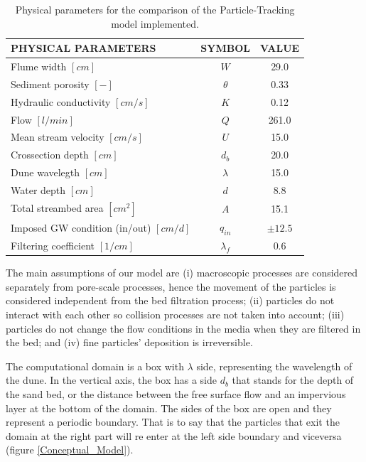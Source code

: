 \documentclass[draft,linenumbers]{agujournal2018}
\begin{document}
\begin{table}
\caption{Physical parameters \citep{Packman2000,Fox2014,Fox2018} for the comparison of the Particle-Tracking model implemented.}
\label{TF:Phys_Param}
\centering
\begin{tabular}{l c c}
\hline
PHYSICAL PARAMETERS						    & SYMBOL			& VALUE			\\
\hline
  Flume width $[cm]$  					    & $W$				& 29.0 			\\
  Sediment porosity $[-]$				    & $\theta$			& 0.33 			\\
  Hydraulic conductivity $[cm/s]$ 		    & $K$				& 0.12 			\\
  Flow $[l/min]$						    & $Q$				& 261.0			\\
  Mean stream velocity $[cm/s]$			    & $U$				& 15.0 			\\
  Crossection depth $[cm]$				    & $d_b$				& 20.0 			\\
  Dune wavelegth $[cm]$					    & $\lambda$			& 15.0 			\\
  Water depth $[cm]$					    & $d$				& 8.8 			\\
  Total streambed area $[cm^{2}]$		    & $A$				& 15.1	 		\\
  Imposed GW condition (in/out) $[cm/d]$    & $q_{in}$			& $\pm 12.5$	\\
  Filtering coefficient $[1/cm]$		    & $\lambda_f$		& 0.6			\\
\hline
\end{tabular}
\end{table}

The main assumptions of our model are (i) macroscopic processes are considered separately from pore-scale processes, hence the movement of the particles is considered independent from the bed filtration process; (ii) particles do not interact with each other so collision processes are not taken into account; (iii) particles do not change the flow conditions in the media when they are filtered in the bed; and (iv) fine particles' deposition is irreversible.

The computational domain is a box with $\lambda$ side, representing the wavelength of the dune. In the vertical axis, the box has a side $d_b$ that stands for the depth of the sand bed, or the distance between the free surface flow and an impervious layer at the bottom of the domain. The sides of the box are open and they represent a periodic boundary. That is to say that the particles that exit the domain at the right part will re enter at the left side boundary and viceversa (figure \ref{Conceptual_Model}). 
\end{document}
